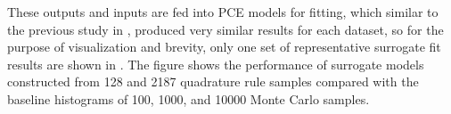 \documentclass[preprint,review,12pt]{elsarticle}
\begin{document}
These outputs and inputs are fed into PCE models for fitting, which similar to the previous study in , produced very similar results for each dataset, so for the purpose of visualization and brevity, only one set of representative surrogate fit results are shown in . The figure shows the performance of surrogate models constructed from 128 and 2187 quadrature rule samples compared with the baseline histograms of 100, 1000, and 10000 Monte Carlo samples. 
\end{document}
